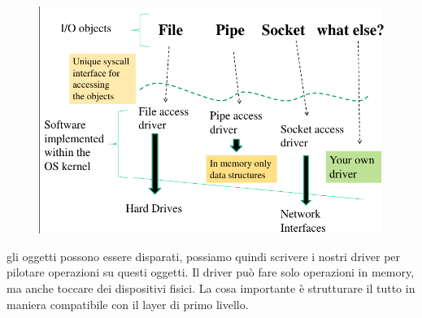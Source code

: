 \documentclass[12pt, oneside]{extbook}
\begin{document}
\begin{figure}[!h]
	\includegraphics[scale=0.4]{immagini/vfs_schema.png}
\end{figure}
gli oggetti possono essere disparati, possiamo quindi scrivere i nostri driver per pilotare operazioni su questi oggetti. Il driver può fare solo operazioni in memory, ma anche toccare dei dispositivi fisici. La cosa importante è strutturare il tutto in maniera compatibile con il layer di primo livello.
\end{document}
